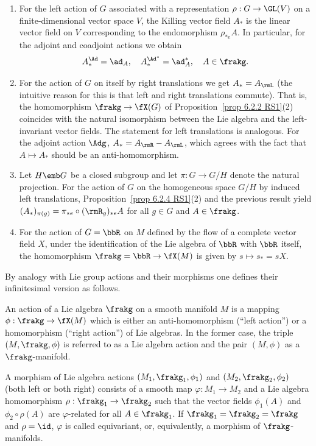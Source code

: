 \begin{example}
    \begin{enumerate}
        \item For the left action of $G$ associated with a representation $\rho:G\to \GL(V)$ on a finite-dimensional vector space $V$, the Killing vector field $A_\ast$ is the linear vector field on $V$ corresponding to the endomorphism $\rho_{\ast e}A$. In particular, for the adjoint and coadjoint actions we obtain
        \[A_\ast^{\Ad}=\ad_A,\quad A_\ast^{\Ad^\ast}=\ad^\ast_A,\quad A\in\frakg.\]
        \item For the action of $G$ on itself by right translations we get $A_\ast=A_\rmL$ (the intuitive reason for this is that left and right translations commute). That is, the homomorphism $\frakg\to \fX(G)$ of Proposition~\ref{prop 6.2.2 RS1}(2) coincides with the natural isomorphism between the Lie algebra and the left-invariant vector fields. The statement for left translations is analogous. For the adjoint action $\Adg$, $A_\ast=A_\rmR-A_\rmL$, which agrees with the fact that $A\mapsto A_\ast$ should be an anti-homomorphism.
        \item Let $H\emb G$ be a closed subgroup and let $\pi:G\to G\slash H$ denote the natural projection. For the action of $G$ on the homogeneous space $G\slash H$ by induced left translations, Proposition~\ref{prop 6.2.4 RS1}(2) and the previous result yield $(A_\ast)_{\pi(g)}=\pi_{\ast e}\circ (\rmR_g)_{\ast e}A$ for all $g\in G$ and $A\in\frakg$.
        \item For the action of $G=\bbR$ on $M$ defined by the flow of a complete vector field $X$, under the identification of the Lie algebra of $\bbR$ with $\bbR$ itself, the homomorphism $\frakg=\bbR\to \fX(M)$ is given by $s\mapsto s_\ast=sX$.
    \end{enumerate}
\end{example}


By analogy with Lie group actions and their morphisms one defines their infinitesimal version as follows.

\begin{defn}
    An action of a Lie algebra $\frakg$ on a smooth manifold $M$ is a mapping $\phi:\frakg\to \fX(M)$ which is either an anti-homomorphism  (``left action'') or a homomorphism (``right action'') of Lie algebras. In the former case, the triple $(M,\frakg,\phi)$ is referred to as a Lie algebra action and the pair $(M,\phi)$ as a $\frakg$-manifold.

    A morphism of Lie algebra actions $(M_1,\frakg_1,\phi_1)$ and $(M_2,\frakg_2,\phi_2)$ (both left or both right) consists of a smooth map $\varphi:M_1\to M_2$ and a Lie algebra homomorphism $\rho:\frakg_1\to\frakg_2$ such that the vector fields $\phi_1(A)$ and $\phi_2\circ\rho(A)$ are $\varphi$-related for all $A\in\frakg_1$. If $\frakg_1=\frakg_2=\frakg$ and $\rho=\id$, $\varphi$ is called equivariant, or, equivalently, a morphism of $\frakg$-manifolds.
\end{defn}

